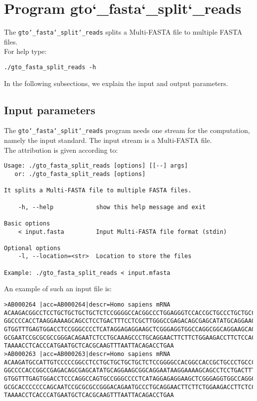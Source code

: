 \section{Program gto\char`_fasta\char`_split\char`_reads}
The \texttt{gto\char`_fasta\char`_split\char`_reads} splits a Multi-FASTA file to multiple FASTA files.\\
For help type:
\begin{lstlisting}
./gto_fasta_split_reads -h
\end{lstlisting}
In the following subsections, we explain the input and output parameters.

\subsection*{Input parameters}

The \texttt{gto\char`_fasta\char`_split\char`_reads} program needs one stream for the computation, namely the input standard. The input stream is a Multi-FASTA file.\\
The attribution is given according to:
\begin{lstlisting}
Usage: ./gto_fasta_split_reads [options] [[--] args]
   or: ./gto_fasta_split_reads [options]

It splits a Multi-FASTA file to multiple FASTA files.

    -h, --help            show this help message and exit

Basic options
    < input.fasta         Input Multi-FASTA file format (stdin)

Optional options
    -l, --location=<str>  Location to store the files

Example: ./gto_fasta_split_reads < input.mfasta
\end{lstlisting}
An example of such an input file is:
\begin{lstlisting}
>AB000264 |acc=AB000264|descr=Homo sapiens mRNA 
ACAAGACGGCCTCCTGCTGCTGCTGCTCTCCGGGGCCACGGCCCTGGAGGGTCCACCGCTGCCCTGCTGCCATTGTCCCC
GGCCCCACCTAAGGAAAAGCAGCCTCCTGACTTTCCTCGCTTGGGCCGAGACAGCGAGCATATGCAGGAAGCGGCAGGAA
GTGGTTTGAGTGGACCTCCGGGCCCCTCATAGGAGAGGAAGCTCGGGAGGTGGCCAGGCGGCAGGAAGCAGGCCAGTGCC
GCGAATCCGCGCGCCGGGACAGAATCTCCTGCAAAGCCCTGCAGGAACTTCTTCTGGAAGACCTTCTCCACCCCCCCAGC
TAAAACCTCACCCATGAATGCTCACGCAAGTTTAATTACAGACCTGAA
>AB000263 |acc=AB000263|descr=Homo sapiens mRNA 
ACAAGATGCCATTGTCCCCCGGCCTCCTGCTGCTGCTGCTCTCCGGGGCCACGGCCACCGCTGCCCTGCCCCTGGAGGGT
GGCCCCACCGGCCGAGACAGCGAGCATATGCAGGAAGCGGCAGGAATAAGGAAAAGCAGCCTCCTGACTTTCCTCGCTTG
GTGGTTTGAGTGGACCTCCCAGGCCAGTGCCGGGCCCCTCATAGGAGAGGAAGCTCGGGAGGTGGCCAGGCGGCAGGAAG
GCGCACCCCCCCAGCAATCCGCGCGCCGGGACAGAATGCCCTGCAGGAACTTCTTCTGGAAGACCTTCTCCTCCTGCAAA
TAAAACCTCACCCATGAATGCTCACGCAAGTTTAATTACAGACCTGAA
\end{lstlisting}


